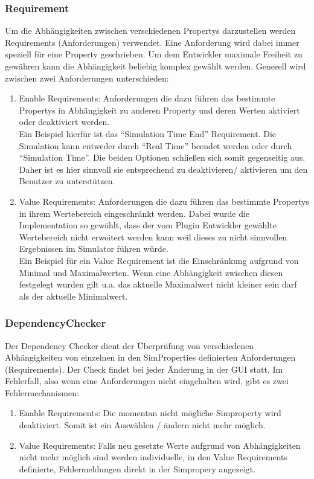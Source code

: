 \documentclass[a4paper, 11pt]{article} %
\begin{document}
\subsubsection{Requirement} %
\label{ssub:requirement}
Um die Abhängigkeiten zwischen verschiedenen Propertys darzustellen werden Requirements (Anforderungen) verwendet. Eine Anforderung wird dabei immer speziell für eine Property geschrieben. Um dem Entwickler maximale Freiheit zu gewähren kann die Abhängigkeit beliebig komplex gewählt werden.
Generell wird zwischen zwei Anforderungen unterschieden:
\begin{enumerate}
	\item Enable Requirements: Anforderungen die dazu führen das bestimmte Propertys in Abhängigkeit zu anderen Property und deren Werten aktiviert oder deaktiviert werden.
	\\Ein Beispiel hierfür ist das "`Simulation Time End"' Requirement. Die Simulation kann entweder durch "`Real Time"' beendet werden oder durch "`Simulation Time"'. Die beiden Optionen schließen sich somit gegenseitig aus. Daher ist es hier sinnvoll sie entsprechend zu deaktivieren/ aktivieren um den Benutzer zu unterstützen.
	\item Value Requirements: Anforderungen die dazu führen das bestimmte Propertys in ihrem Wertebereich eingeschränkt werden. Dabei wurde die Implementation so gewählt, dass der vom Plugin Entwickler gewählte Wertebereich nicht erweitert werden kann weil dieses zu nicht sinnvollen Ergebnissen im Simulator führen würde.
	\\ Ein Beispiel für ein Value Requirement ist die Einschränkung aufgrund von Minimal und Maximalwerten. Wenn eine Abhängigkeit zwischen diesen festgelegt wurden gilt u.a. das aktuelle Maximalwert nicht kleiner sein darf als der aktuelle Minimalwert.
\end{enumerate}

\subsubsection{DependencyChecker}
\label{sssub:dependencychecker}
Der Dependency Checker dient der Überprüfung von verschiedenen Abhängigkeiten von einzelnen in den SimProperties definierten Anforderungen (Requirements).
Der Check findet bei jeder Änderung in der GUI statt. Im Fehlerfall, also wenn eine Anforderungen nicht eingehalten wird, gibt es zwei Fehlermechanismen:
\begin{enumerate}
	\item Enable Requirements: Die momentan nicht mögliche Simproperty wird deaktiviert. Somit ist ein Auswählen / ändern nicht mehr möglich.
	\item Value Requirements: Falls neu gesetzte Werte aufgrund von Abhängigkeiten nicht mehr möglich sind werden individuelle, in den Value Requirements definierte, Fehlermeldungen direkt in der Simpropery angezeigt.
\end{enumerate}
\end{document}
